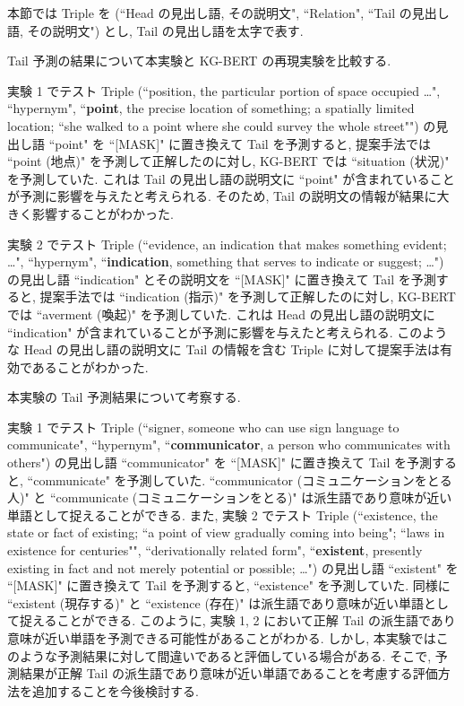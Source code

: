 本節では Triple を (``Head の見出し語, その説明文", ``Relation", ``Tail の見出し語, その説明文") とし, Tail の見出し語を太字で表す. \par
Tail 予測の結果について本実験と KG-BERT の再現実験を比較する. \par
実験 1 でテスト Triple (``position, the particular portion of space occupied …", ``hypernym", ``\textbf{point}, the precise location of something; a spatially limited location; ``she walked to a point where she could survey the whole street"") の見出し語 ``point" を ``[MASK]" に置き換えて Tail を予測すると, 提案手法では ``point (地点)" を予測して正解したのに対し, KG-BERT では ``situation (状況)" を予測していた. これは Tail の見出し語の説明文に ``point" が含まれていることが予測に影響を与えたと考えられる. そのため, Tail の説明文の情報が結果に大きく影響することがわかった. \par
実験 2 でテスト Triple (``evidence, an indication that makes something evident; …", ``hypernym", ``\textbf{indication}, something that serves to indicate or suggest; …") の見出し語 ``indication" とその説明文を ``[MASK]" に置き換えて Tail を予測すると, 提案手法では ``indication (指示)" を予測して正解したのに対し, KG-BERT では ``averment (喚起)" を予測していた. これは Head の見出し語の説明文に ``indication" が含まれていることが予測に影響を与えたと考えられる. このような Head の見出し語の説明文に Tail の情報を含む Triple に対して提案手法は有効であることがわかった.\par
本実験の Tail 予測結果について考察する. \par
実験 1 でテスト Triple (``signer, someone who can use sign language to communicate", ``hypernym", ``\textbf{communicator}, a person who communicates with others") の見出し語 ``communicator" を ``[MASK]" に置き換えて Tail を予測すると, ``communicate" を予測していた. ``communicator (コミュニケーションをとる人)" と ``communicate (コミュニケーションをとる)" は派生語であり意味が近い単語として捉えることができる. また, 実験 2 でテスト Triple (``existence, the state or fact of existing; ``a point of view gradually coming into being"; ``laws in existence for centuries"", ``derivationally related form", ``\textbf{existent}, presently existing in fact and not merely potential or possible; …") の見出し語 ``existent" を ``[MASK]" に置き換えて Tail を予測すると, ``existence" を予測していた. 同様に ``existent (現存する)" と ``existence (存在)" は派生語であり意味が近い単語として捉えることができる. このように, 実験 1, 2 において正解 Tail の派生語であり意味が近い単語を予測できる可能性があることがわかる. しかし, 本実験ではこのような予測結果に対して間違いであると評価している場合がある. そこで, 予測結果が正解 Tail の派生語であり意味が近い単語であることを考慮する評価方法を追加することを今後検討する. \par
